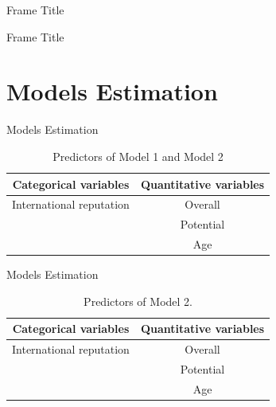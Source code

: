 \documentclass[aspectratio=169,xcolor=dvipsnames]{beamer}
\begin{document}

\begin{frame}{Frame Title}
    
\end{frame}


\begin{frame}{Frame Title}
    
\end{frame}


\section{Models Estimation}



\begin{frame}{Models Estimation}
\begin{table}[ht]
\centering
\begin{tabular}{cc}
  \hline
    Categorical variables & Quantitative variables \\ 
  \hline
    International reputation & Overall \\ 
        & Potential \\ 
        & Age \\ 
   \hline
\end{tabular}
\caption{Predictors of Model 1 and Model 2}
\end{table}
\end{frame}


\begin{frame}{Models Estimation}
\begin{table}[ht]
\centering
\begin{tabular}{cc}
  \hline
    Categorical variables & Quantitative variables \\ 
  \hline
    International reputation & Overall \\ 
        & Potential \\ 
        & Age \\ 
   \hline
\end{tabular}
\caption{Predictors of Model 2.}
\end{table}
\end{frame}
\end{document}
